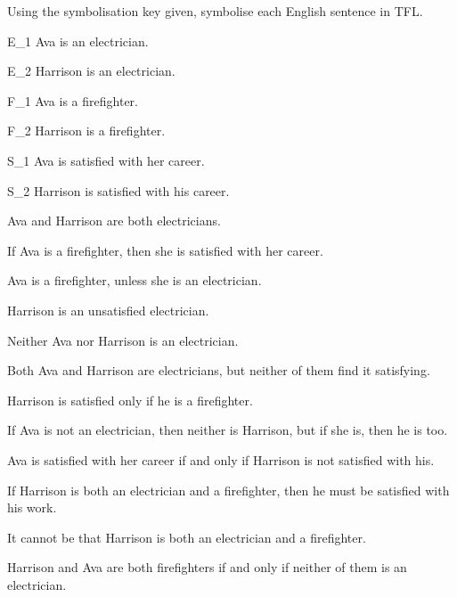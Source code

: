 \solutions

\problempart Using the symbolisation key given, symbolise each English sentence in TFL.\label{pr.avacareer}
	\begin{ekey}
		\item[E_1] Ava is an electrician.
		\item[E_2] Harrison is an electrician.
		\item[F_1] Ava is a firefighter.
		\item[F_2] Harrison is a firefighter.
		\item[S_1] Ava is satisfied with her career.
		\item[S_2] Harrison is satisfied with his career.
	\end{ekey}
\begin{earg}
\item Ava and Harrison are both electricians.
\item[] 
\item If Ava is a firefighter, then she is satisfied with her career.
\item[] 
\item Ava is a firefighter, unless she is an electrician.
\item[] 
\item Harrison is an unsatisfied electrician.
\item[] 
\item Neither Ava nor Harrison is an electrician.
\item[] 
\item Both Ava and Harrison are electricians, but neither of them find it satisfying.
\item[] 
\item Harrison is satisfied only if he is a firefighter.
\item[] 
\item If Ava is not an electrician, then neither is Harrison, but if she is, then he is too.
\item[] 
\item Ava is satisfied with her career if and only if Harrison is not satisfied with his.
\item[] 
\item If Harrison is both an electrician and a firefighter, then he must be satisfied with his work.
\item[] 
\item It cannot be that Harrison is both an electrician and a firefighter.
\item[] 
\item Harrison and Ava are both firefighters if and only if neither of them is an electrician.
\item[] 
\end{earg}

